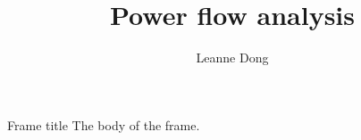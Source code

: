\documentclass[pdf]{beamer}
\title{Power flow analysis}
\author{Leanne Dong}
\begin{document}
\begin{frame}
\titlepage
\end{frame}
\begin{frame}{Frame title}
The body of the frame.
\end{frame}
\end{document}
